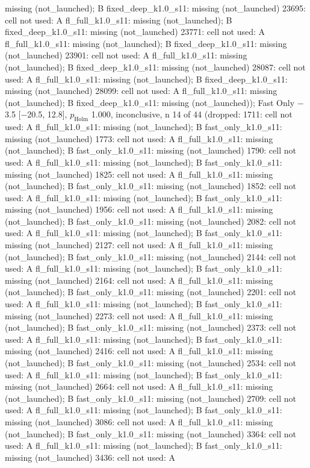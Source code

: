 \begin{table}[t]
{missing (not\_launched); B fixed\_deep\_k1.0\_s11: missing (not\_launched) \textbar{} 23695: cell not used: A fl\_full\_k1.0\_s11: missing (not\_launched); B fixed\_deep\_k1.0\_s11: missing (not\_launched) \textbar{} 23771: cell not used: A fl\_full\_k1.0\_s11: missing (not\_launched); B fixed\_deep\_k1.0\_s11: missing (not\_launched) \textbar{} 23901: cell not used: A fl\_full\_k1.0\_s11: missing (not\_launched); B fixed\_deep\_k1.0\_s11: missing (not\_launched) \textbar{} 28087: cell not used: A fl\_full\_k1.0\_s11: missing (not\_launched); B fixed\_deep\_k1.0\_s11: missing (not\_launched) \textbar{} 28099: cell not used: A fl\_full\_k1.0\_s11: missing (not\_launched); B fixed\_deep\_k1.0\_s11: missing (not\_launched)); Fast Only $-$3.5 [$-$20.5, 12.8], $p_\mathrm{Holm}$ 1.000, inconclusive, n 14 of 44 (dropped: 1711: cell not used: A fl\_full\_k1.0\_s11: missing (not\_launched); B fast\_only\_k1.0\_s11: missing (not\_launched) \textbar{} 1773: cell not used: A fl\_full\_k1.0\_s11: missing (not\_launched); B fast\_only\_k1.0\_s11: missing (not\_launched) \textbar{} 1790: cell not used: A fl\_full\_k1.0\_s11: missing (not\_launched); B fast\_only\_k1.0\_s11: missing (not\_launched) \textbar{} 1825: cell not used: A fl\_full\_k1.0\_s11: missing (not\_launched); B fast\_only\_k1.0\_s11: missing (not\_launched) \textbar{} 1852: cell not used: A fl\_full\_k1.0\_s11: missing (not\_launched); B fast\_only\_k1.0\_s11: missing (not\_launched) \textbar{} 1956: cell not used: A fl\_full\_k1.0\_s11: missing (not\_launched); B fast\_only\_k1.0\_s11: missing (not\_launched) \textbar{} 2082: cell not used: A fl\_full\_k1.0\_s11: missing (not\_launched); B fast\_only\_k1.0\_s11: missing (not\_launched) \textbar{} 2127: cell not used: A fl\_full\_k1.0\_s11: missing (not\_launched); B fast\_only\_k1.0\_s11: missing (not\_launched) \textbar{} 2144: cell not used: A fl\_full\_k1.0\_s11: missing (not\_launched); B fast\_only\_k1.0\_s11: missing (not\_launched) \textbar{} 2164: cell not used: A fl\_full\_k1.0\_s11: missing (not\_launched); B fast\_only\_k1.0\_s11: missing (not\_launched) \textbar{} 2201: cell not used: A fl\_full\_k1.0\_s11: missing (not\_launched); B fast\_only\_k1.0\_s11: missing (not\_launched) \textbar{} 2273: cell not used: A fl\_full\_k1.0\_s11: missing (not\_launched); B fast\_only\_k1.0\_s11: missing (not\_launched) \textbar{} 2373: cell not used: A fl\_full\_k1.0\_s11: missing (not\_launched); B fast\_only\_k1.0\_s11: missing (not\_launched) \textbar{} 2416: cell not used: A fl\_full\_k1.0\_s11: missing (not\_launched); B fast\_only\_k1.0\_s11: missing (not\_launched) \textbar{} 2534: cell not used: A fl\_full\_k1.0\_s11: missing (not\_launched); B fast\_only\_k1.0\_s11: missing (not\_launched) \textbar{} 2664: cell not used: A fl\_full\_k1.0\_s11: missing (not\_launched); B fast\_only\_k1.0\_s11: missing (not\_launched) \textbar{} 2709: cell not used: A fl\_full\_k1.0\_s11: missing (not\_launched); B fast\_only\_k1.0\_s11: missing (not\_launched) \textbar{} 3086: cell not used: A fl\_full\_k1.0\_s11: missing (not\_launched); B fast\_only\_k1.0\_s11: missing (not\_launched) \textbar{} 3364: cell not used: A fl\_full\_k1.0\_s11: missing (not\_launched); B fast\_only\_k1.0\_s11: missing (not\_launched) \textbar{} 3436: cell not used: A }
\end{table}
